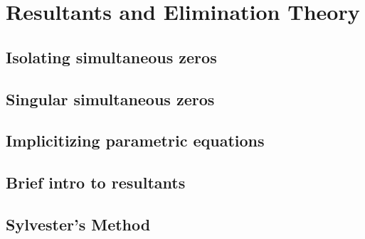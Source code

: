 \chapter{Resultants and Elimination Theory}

\section{Isolating simultaneous zeros}

\section{Singular simultaneous zeros}

\section{Implicitizing parametric equations}

\section{Brief intro to resultants}

\section{Sylvester's Method}
